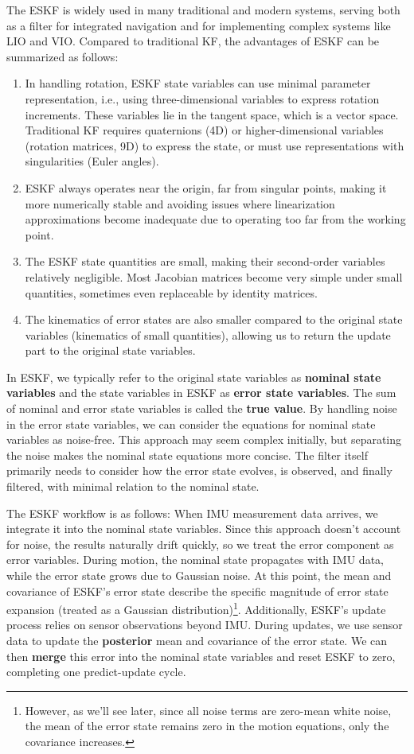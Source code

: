 The ESKF is widely used in many traditional and modern systems, serving both as a filter for integrated navigation and for implementing complex systems like LIO and VIO\cite{Xu2021,xu2021fast, Bloesch2017}. Compared to traditional KF, the advantages of ESKF can be summarized as follows\cite{Madyastha2011}:
\begin{enumerate}
	\item In handling rotation, ESKF state variables can use minimal parameter representation, i.e., using three-dimensional variables to express rotation increments. These variables lie in the tangent space, which is a vector space. Traditional KF requires quaternions (4D) or higher-dimensional variables (rotation matrices, 9D) to express the state, or must use representations with singularities (Euler angles).
	\item ESKF always operates near the origin, far from singular points, making it more numerically stable and avoiding issues where linearization approximations become inadequate due to operating too far from the working point.
	\item The ESKF state quantities are small, making their second-order variables relatively negligible. Most Jacobian matrices become very simple under small quantities, sometimes even replaceable by identity matrices.
	\item The kinematics of error states are also smaller compared to the original state variables (kinematics of small quantities), allowing us to return the update part to the original state variables.
\end{enumerate}
In ESKF, we typically refer to the original state variables as \textbf{nominal state variables} and the state variables in ESKF as \textbf{error state variables}. The sum of nominal and error state variables is called the \textbf{true value}. By handling noise in the error state variables, we can consider the equations for nominal state variables as noise-free. This approach may seem complex initially, but separating the noise makes the nominal state equations more concise. The filter itself primarily needs to consider how the error state evolves, is observed, and finally filtered, with minimal relation to the nominal state.

The ESKF workflow is as follows: When IMU measurement data arrives, we integrate it into the nominal state variables. Since this approach doesn't account for noise, the results naturally drift quickly, so we treat the error component as error variables. During motion, the nominal state propagates with IMU data, while the error state grows due to Gaussian noise. At this point, the mean and covariance of ESKF's error state describe the specific magnitude of error state expansion (treated as a Gaussian distribution)\footnote{However, as we'll see later, since all noise terms are zero-mean white noise, the mean of the error state remains zero in the motion equations, only the covariance increases.}. Additionally, ESKF's update process relies on sensor observations beyond IMU. During updates, we use sensor data to update the \textbf{posterior} mean and covariance of the error state. We can then \textbf{merge} this error into the nominal state variables and reset ESKF to zero, completing one predict-update cycle.

